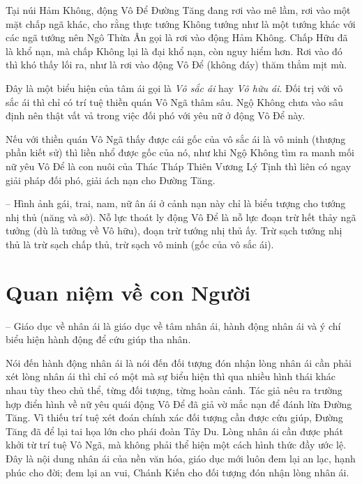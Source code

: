 Tại núi Hảm Không, động Vô Để Đường Tăng đang rơi vào mê lầm, rơi vào một mặt chấp ngã khác, cho rằng thực tướng Không tướng như là một tướng khác với các ngã tướng nên Ngô Thừa Ân gọi là rơi vào động Hảm Không. Chấp Hữu đã là khổ nạn, mà chấp Không lại là đại khổ nạn, còn nguy hiểm hơn. Rơi vào đó thì khó thấy lối ra, như là rơi vào động Vô Để (không đáy) thăm thẳm mịt mù.

Đây là một biểu hiện của tâm ái gọi là \emph{Vô sắc ái} hay \emph{Vô hữu ái}. Đối trị với vô sắc ái thì chỉ có trí tuệ thiền quán Vô Ngã thâm sâu. Ngộ Không chưa vào sâu định nên thật vất vả trong việc đối phó với yêu nữ ở động Vô Để này.

Nếu với thiền quán Vô Ngã thấy được cái gốc của vô sắc ái là vô minh (thượng phần kiết sử) thì liền nhổ được gốc của nó, như khi Ngộ Không tìm ra manh mối nữ yêu Vô Để là con nuôi của Thác Tháp Thiên Vương Lý Tịnh thì liên có ngay giải pháp đối phó, giải ách nạn cho Đường Tăng.

-- Hình ảnh gái, trai, nam, nữ ân ái ở cảnh nạn này chỉ là biểu tượng cho tướng nhị thủ (năng và sở). Nỗ lực thoát ly động Vô Để là nỗ lực đoạn trừ hết thảy ngã tưởng (dù là tưởng về Vô hữu), đoạn trừ tướng nhị thủ ấy. Trừ sạch tướng nhị thủ là trừ sạch chấp thủ, trừ sạch vô minh (gốc của vô sắc ái).

\section{Quan niệm về con Người} %
\label{sec:80_81_con_nguoi}

-- Giáo dục về nhân ái là giáo dục về tâm nhân ái, hành động nhân ái và ý chí biểu hiện hành động để cứu giúp tha nhân.

Nói đến hành động nhân ái là nói đến đối tượng đón nhận lòng nhân ái cần phải xét lòng nhân ái thì chỉ có một mà sự biểu hiện thì qua nhiều hình thái khác nhau tùy theo chủ thể, từng đối tượng, từng hoàn cảnh. Tác giả nêu ra trường hợp điển hình về nữ yêu quái động Vô Để đã giả vờ mắc nạn để đánh lừa Đường Tăng. Vì thiếu trí tuệ xét đoán chính xác đối tượng cần được cứu giúp, Đường Tăng đã để lại tai họa lớn cho phái đoàn Tây Du. Lòng nhân ái cần được phát khởi từ trí tuệ Vô Ngã, mà không phải thể hiện một cách hình thức đầy ước lệ. Đây là nội dung nhân ái của nền văn hóa, giáo dục mới luôn đem lại an lạc, hạnh phúc cho đời; đem lại an vui, Chánh Kiến cho đối tượng đón nhận lòng nhân ái.

